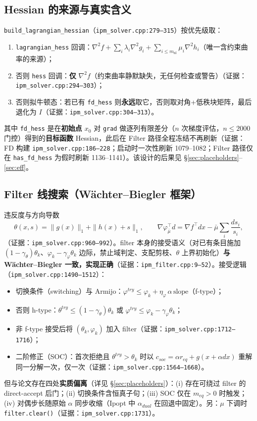 \documentclass[11pt,a4paper]{ctexart}
\newcommand{\file}[1]{\texttt{#1}}
\newcommand{\func}[1]{\texttt{#1}}
\newcommand{\opt}[1]{\texttt{#1}}
\newcommand{\evid}[1]{{\footnotesize\color{black!70}（证据：#1）}}
\begin{document}
\subsection{Hessian 的来源与真实含义}\label{sec:hess}
\func{build\_lagrangian\_hessian}（\file{ipm\_solver.cpp:279--315}）按优先级取：
\begin{enumerate}[leftmargin=2em]
  \item \opt{lagrangian\_hess} 回调：$\nabla^2 f + \sum_i \lambda_i \nabla^2 g_i + \sum_{i\le m_{\mathrm{nl}}} \mu_i \nabla^2 h_i$（唯一含约束曲率的来源）；
  \item 否则 \opt{hess} 回调：\textbf{仅} $\nabla^2 f$（约束曲率静默缺失，无任何检查或警告）\evid{\file{ipm\_solver.cpp:294--303}}；
  \item 否则拟牛顿态：若已有 \opt{fd\_hess} 则\textbf{永远}取它，否则取对角+低秩块矩阵，最后退化为 $I$\evid{\file{ipm\_solver.cpp:304--313}}。
\end{enumerate}
其中 \opt{fd\_hess} 是在\textbf{初始点 $x_0$} 对 \opt{grad} 做逐列有限差分（$n$ 次梯度评估，$n\le 2000$ 门控）得到的\textbf{目标函数} Hessian，此后在 Filter 路径全程冻结不再刷新\evid{FD 构建 \file{ipm\_solver.cpp:186--228}；启动时一次性刷新 1079--1082；Filter 路径仅在 \opt{has\_fd\_hess} 为假时刷新 1136--1141}。该设计的后果见 \S\ref{sec:placeholders}--\ref{sec:eff}。

\subsection{Filter 线搜索（Wächter--Biegler 框架）}
违反度与方向导数
\begin{equation}
\theta(x,s) = \|g(x)\|_1 + \|h(x)+s\|_1,\qquad
\nabla\varphi_{\bar\mu}^{\top} d = \nabla f^{\top} dx - \bar\mu \sum_i \frac{ds_i}{s_i},
\end{equation}
\evid{\file{ipm\_solver.cpp:960--992}}。filter 本身的接受语义（对已有条目施加 $(1-\gamma_\theta)\theta_k$、$\varphi_k-\gamma_\varphi\theta_k$ 边际，禁止域判定、支配剪枝、$\theta$ 上界初始化）\textbf{与 Wächter--Biegler 一致，实现正确}\evid{\file{ipm\_filter.cpp:9--52}}。接受逻辑（\file{ipm\_solver.cpp:1490--1512}）：
\begin{itemize}[leftmargin=2em]
  \item 切换条件（switching）与 Armijo：$\varphi^{try} \le \varphi_k + \eta_\varphi\, \alpha\, \mathrm{slope}$（f-type）；
  \item 否则 h-type：$\theta^{try}\le(1-\gamma_\theta)\theta_k$ 或 $\varphi^{try}\le\varphi_k-\gamma_\varphi\theta_k$；
  \item 非 f-type 接受后将 $(\theta_k,\varphi_k)$ 加入 filter\evid{\file{ipm\_solver.cpp:1712--1716}}；
  \item 二阶修正（SOC）：首次拒绝且 $\theta^{try}>\theta_k$ 时以 $c_{soc}=\alpha r_{eq}+g(x{+}\alpha dx)$ 重解同一分解一次，仅一次\evid{\file{ipm\_solver.cpp:1564--1668}}。
\end{itemize}
但与论文存在四处\textbf{实质偏离}（详见 \S\ref{sec:placeholders}）：(i) 存在可绕过 filter 的 direct-accept 后门；(ii) 切换条件含恒真子句；(iii) SOC 仅在 $m_{eq}>0$ 时触发；(iv) 对偶步长随原始 $\alpha$ 同步收缩（Ipopt 中 $\alpha_{dual}$ 在回退中固定）。另：$\mu$ 下调时 \func{filter.clear()}\evid{\file{ipm\_solver.cpp:1731}}。
\end{document}

